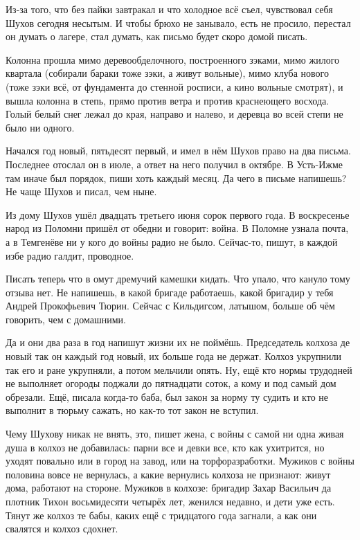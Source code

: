 Из-за того, что без пайки завтракал и что холодное всё съел, чувствовал себя Шухов сегодня
несытым. И чтобы брюхо не занывало, есть не просило, перестал он думать о лагере, стал думать,
как письмо будет скоро домой писать.

Колонна прошла мимо деревообделочного, построенного зэками, мимо жилого квартала (собирали
бараки тоже зэки, а живут вольные), мимо клуба нового (тоже зэки всё, от фундамента до стенной
росписи, а кино вольные смотрят), и вышла колонна в степь, прямо против ветра и против
краснеющего восхода. Голый белый снег лежал до края, направо и налево, и деревца во всей
степи не было ни одного.

Начался год новый, пятьдесят первый, и имел в нём Шухов право на два письма. Последнее
отослал он в июле, а ответ на него получил в октябре. В Усть-Ижме \dash там иначе был порядок, пиши
хоть каждый месяц. Да чего в письме напишешь? Не чаще Шухов и писал, чем ныне.

Из дому Шухов ушёл двадцать третьего июня сорок первого года. В воскресенье народ из Поломни
пришёл от обедни и говорит: война. В Поломне узнала почта, а в Темгенёве ни у кого до войны
радио не было. Сейчас-то, пишут, в каждой избе радио галдит, проводное.

Писать теперь \dash что в омут дремучий камешки кидать. Что упало, что кануло \dash тому отзыва нет.
Не напишешь, в какой бригаде работаешь, какой бригадир у тебя Андрей Прокофьевич Тюрин.
Сейчас с Кильдигсом, латышом, больше об чём говорить, чем с домашними.

Да и они два раза в год напишут \dash жизни их не поймёшь. Председатель колхоза де новый \dash так он
каждый год новый, их больше года не держат. Колхоз укрупнили \dash так его и ране укрупняли, а
потом мельчили опять. Ну, ещё кто нормы трудодней не выполняет \dash огороды поджали до
пятнадцати соток, а кому и под самый дом обрезали. Ещё, писала когда-то баба, был закон за
норму ту судить и кто не выполнит \dash в тюрьму сажать, но как-то тот закон не вступил.

Чему Шухову никак не внять, это, пишет жена, с войны с самой ни одна живая душа в колхоз не
добавилась: парни все и девки все, кто как ухитрится, но уходят повально или в город на завод,
или на торфоразработки. Мужиков с войны половина вовсе не вернулась, а какие вернулись \dash
колхоза не признают: живут дома, работают на стороне. Мужиков в колхозе: бригадир Захар
Васильич да плотник Тихон восьмидесяти четырёх лет, женился недавно, и дети уже есть. Тянут
же колхоз те бабы, каких ещё с тридцатого года загнали, а как они свалятся \dash и колхоз сдохнет.

